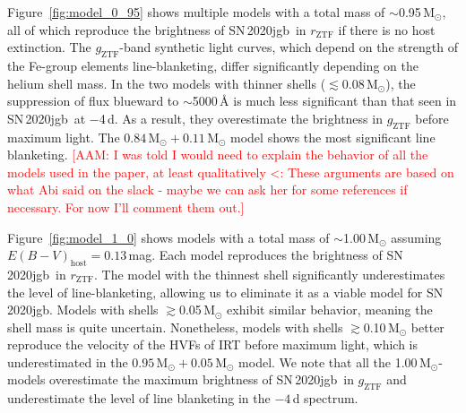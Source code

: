 \documentclass[twocolumn]{aastex631}
\newcommand{\sn}{SN\,2020jgb}
\newcommand{\Ni}{$^{56}\mathrm{Ni}$}
\newcommand{\Msun}{\mathrm{M_\odot}}
\newcommand{\adam}[1]{\textcolor{red}{[AAM: #1]}}
\newcommand{\chang}[1]{\textcolor{blue}{[Chang: #1]}}
\begin{document}
Figure~\ref{fig:model_0_95} shows multiple models with a total mass of $\sim$0.95\,$\Msun$, all of which reproduce the brightness of \sn\ in $r_\mathrm{ZTF}$ if there is no host extinction. The $g_\mathrm{ZTF}$-band synthetic light curves, which depend on the strength of the Fe-group elements line-blanketing, differ significantly depending on the helium shell mass. In the two models with thinner shells ($\lesssim$0.08\,$\Msun$), the suppression of flux blueward to $\sim$5000\,\r{A} is much less significant than that seen in \sn\ at $-$4\,d. As a result, they overestimate the brightness in $g_\mathrm{ZTF}$ before maximum light. The $0.84\,\Msun+0.11\,\Msun$ model shows the most significant line blanketing. %
\adam{I was told I would need to explain the behavior of all the models used in the paper, at least qualitatively <: These arguments are based on what Abi said on the slack - maybe we can ask her for some references if necessary. For now I'll comment them out.}

Figure~\ref{fig:model_1_0} shows models with a total mass of $\sim$1.00\,$\Msun$ assuming $E(B-V)_\mathrm{host}=0.13$\,mag. Each model reproduces the brightness of \sn\ in $r_\mathrm{ZTF}$. The model with the thinnest shell significantly underestimates the level of line-blanketing, allowing us to eliminate it as a viable model for \sn. Models with shells $\gtrsim$0.05\,$\Msun$ exhibit similar behavior, meaning the shell mass is quite uncertain. Nonetheless, models with shells $\gtrsim$0.10\,$\Msun$ better reproduce the velocity of the HVFs of  IRT before maximum light, which is underestimated in the $0.95\,\Msun+0.05\,\Msun$ model. We note that all the 1.00\,$\Msun$-models overestimate the maximum brightness of \sn\ in $g_\mathrm{ZTF}$ and underestimate the level of line blanketing in the $-4$\,d spectrum. %
\end{document}
